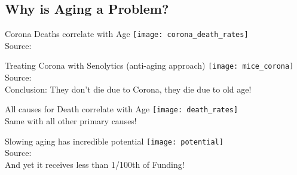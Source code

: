 \subsection{Why is Aging a Problem?}

\begin{frame}[c]{Corona Deaths correlate with Age}
    \large
    \texttt{[image: corona\_death\_rates]} \\
    Source: \cite{10.1111/acel.13230} \\
\end{frame}


\begin{frame}[c]{Treating Corona with Senolytics (anti-aging approach)}
    \large
    \texttt{[image: mice\_corona]} \\
    Source: \cite{camell2021senolytics} \\
    \pause
    Conclusion: They don't die due to Corona, they die due to old age!
\end{frame}


\begin{frame}[c]{All causes for Death correlate with Age}
    \large
    \texttt{[image: death\_rates]} \\
    \pause
    Same with all other primary causes!
\end{frame}


\begin{frame}[c]{Slowing aging has incredible potential}
    \large
    \texttt{[image: potential]} \\
    Source: \cite{10.1093/ppar/prz022} \\
    \pause
    And yet it receives less than 1/100th of Funding!
\end{frame}


